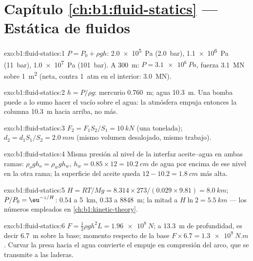 \section*{Capítulo \ref{ch:b1:fluid-statics} --- Estática de fluidos}

\begin{solution}{exo:b1:fluid-statics:1}
$P = P_0 + \rho gh$: \qty{2.0e5}{Pa} (\qty{2.0}{bar}), \qty{1.1e6}{Pa}
(\qty{11}{bar}), \qty{1.0e7}{Pa} (\qty{101}{bar}). A \qty{300}{m}: $P =
\qty{3.1e6}{Pa}$, fuerza \qty{3.1}{MN} sobre \qty{1}{m^2} (neta, contra
\qty{1}{atm} en el interior: \qty{3.0}{MN}).
\end{solution}

\begin{solution}{exo:b1:fluid-statics:2}
$h = P/\rho g$: mercurio \qty{0.760}{m}; agua \qty{10.3}{m}. Una bomba puede
a lo sumo hacer el vacío sobre el agua: la atmósfera empuja entonces la
columna \qty{10.3}{m} hacia arriba, no más.
\end{solution}

\begin{solution}{exo:b1:fluid-statics:3}
$F_2 = F_1S_2/S_1 = \qty{10}{kN}$ (una tonelada); $d_2 = d_1S_1/S_2 = \qty{2.0}{mm}$
(mismo volumen desalojado, mismo trabajo).
\end{solution}

\begin{solution}{exo:b1:fluid-statics:4}
Misma presión al nivel de la interfaz aceite--agua en ambas ramas: $\rho_og
h_o = \rho_wgh_w$, $h_w = 0.85 \times 12 = \qty{10.2}{cm}$ de agua por encima
de ese nivel en la otra rama; la superficie del aceite queda
$12 - 10.2 = \qty{1.8}{cm}$ más alta.
\end{solution}

\begin{solution}{exo:b1:fluid-statics:5}
$H = RT/Mg = 8.314 \times 273/(0.029 \times 9.81) = \qty{8.0}{km}$; $P/P_0 =
\eu^{-z/H}$: $0.54$ a \qty{5}{km}, $0.33$ a \qty{8848}{m}; la mitad a $H\ln2 =
\qty{5.5}{km}$ --- los números empleados en \cref{ch:b1:kinetic-theory}.
\end{solution}

\begin{solution}{exo:b1:fluid-statics:6}
$F = \tfrac12\rho gh^2L = \qty{1.96e8}{N}$;  a \qty{13.3}{m}
de profundidad, es decir \qty{6.7}{m} sobre la base; momento respecto de la base $F \times
6.7 = \qty{1.3e9}{N.m}$. Curvar la presa hacia el agua convierte el empuje
en compresión del arco, que se transmite a las laderas.
\end{solution}

